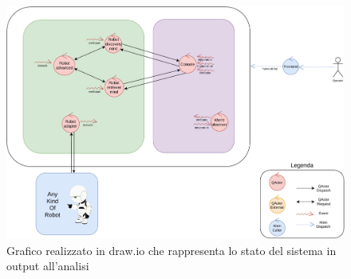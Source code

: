 \documentclass{llncs}
\newcommand{\labelsec}[1]{\label{sec:#1}}
\newcommand{\labelssec}[1]{\label{ssec:#1}}
\begin{document}
\begin{figure}[H]
  \centering%
  \includegraphics[width=\textwidth]{res/analysis}%
  \caption{Grafico realizzato in draw.io che rappresenta lo stato del sistema in output all'analisi}%
  \label{fig:analysis}
\end{figure}





\end{document}
